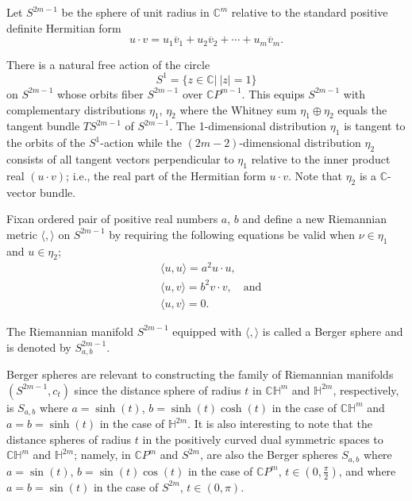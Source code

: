 Let $S^{2m-1}$ be the sphere of unit radius in $\mathbb{C}^{m}$
relative to the standard positive definite Hermitian form
$$
u\cdot
v=u_{1}\overline{v}_{1}+u_{2}\overline{v}_{2}+\cdots+u_{m}\overline{v}_{m}.
$$

There is a natural free action of the circle
$$
S^{1}=\{z\in \mathbb{C}|~|z|=1\}
$$
on $S^{2m-1}$ whose orbits fiber $S^{2m-1}$ over
$\mathbb{C}P^{m-1}$. This equips $S^{2m-1}$ with complementary
distributions $\eta_{1}$, $\eta_{2}$ where the Whitney sum
$\eta_{1}\oplus \eta_{2}$ equals the tangent bundle $TS^{2m-1}$ of
$S^{2m-1}$. The 1-dimensional distribution $\eta_{1}$ is tangent to
the orbits of the $S^{1}$-action while the $(2m-2)$-dimensional
distribution $\eta_{2}$ consists of all tangent vectors perpendicular
to $\eta_{1}$ relative to the inner product real $(u\cdot v)$; i.e.,
the real part of the Hermitian form $u\cdot v$. Note that $\eta_{2}$
is a $\mathbb{C}$-vector bundle.

Fix\pageoriginale an ordered pair of positive real numbers $a$, $b$
and define a new Riemannian metric $\langle,\rangle$ on $S^{2m-1}$ by
requiring the following equations be valid when $\nu\in \eta_{1}$ and
$u\in \eta_{2}$;
\begin{align*}
& \langle u,u\rangle = a^{2}u\cdot u,\\
& \langle u,v\rangle =b^{2}v\cdot v,\quad\text{and}\\
& \langle u,v\rangle =0.
\end{align*}

The Riemannian manifold $S^{2m-1}$ equipped with $\langle,\rangle$ is
called a Berger sphere and is denoted by $S^{2m-1}_{a,b}$.

Berger spheres are relevant to constructing the family of Riemannian
manifolds $(S^{2m-1},c_{t})$ since the distance sphere of radius $t$
in $\mathbb{CH}^{m}$ and $\mathbb{H}^{2m}$, respectively, is $S_{a,b}$
where $a=\sinh(t)$, $b=\sinh(t)\cosh (t)$ in the case of
$\mathbb{CH}^{m}$ and $a=b=\sinh(t)$ in the case of
$\mathbb{H}^{2m}$. It is also interesting to note that the distance
spheres of radius $t$ in the positively curved dual symmetric spaces
to $\mathbb{CH}^{m}$ and $\mathbb{H}^{2m}$; namely, in
$\mathbb{C}P^{m}$ and $S^{2m}$, are also the Berger spheres $S_{a,b}$
where $a=\sin(t)$, $b=\sin(t)\cos(t)$ in the case of
$\mathbb{C}P^{m}$, $t\in (0,\frac{\pi}{2})$, and where $a=b=\sin(t)$
in the case of $S^{2m}$, $t\in (0,\pi)$.

